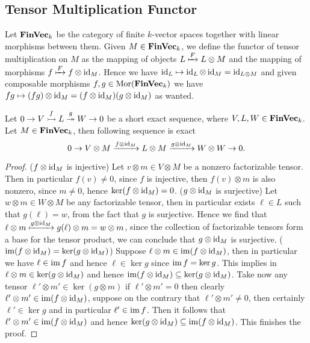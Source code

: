 \subsection{Tensor Multiplication Functor}

\begin{definition}
  Let \({\textbf{FinVec}}_k\) be the category of finite \(k\)-vector spaces together
  with linear morphisms between them. Given \(M \in {\textbf{FinVec}}_k\), we define
  the functor of tensor multiplication on \(M\) as the mapping of objects \(L
  \xmapsto F L \otimes M\) and the mapping of morphisms \(f \xmapsto F f \otimes
  \operatorname{id}_M\). Hence we have \(\operatorname{id}_L \mapsto \operatorname{id}_L \otimes \operatorname{id}_M = \operatorname{id}_{L \otimes
  M}\) and given composable morphisms \(f, g \in \operatorname{Mor}({\textbf{FinVec}}_k)\) we have
  \(f g \mapsto (f g) \otimes \operatorname{id}_M = (f \otimes \operatorname{id}_M) (g
  \otimes \operatorname{id}_M)\) as wanted.
\end{definition}

\begin{proposition}[Exactness]
  Let \(0 \to V \overset{f}{\rightarrowtail} L \overset{g}{\twoheadrightarrow} W \to
  0\) be a short exact sequence, where \(V, L, W \in {\textbf{FinVec}}_k\). Let \(M
  \in {\textbf{FinVec}}_k\), then following sequence is exact
  \[
    0 \to V \otimes M \xrightarrow{f \otimes \operatorname{id}_M}
    L \otimes M \xrightarrow{g \otimes \operatorname{id}_M} W \otimes W \to 0.
  \]
\end{proposition}

\begin{proof}
  (\(f \otimes \operatorname{id}_M\) is injective) Let \(v \otimes m \in V \otimes M\) be a
  nonzero factorizable tensor. Then in particular \(f(v) \neq 0\), since \(f\)
  is injective, then \(f(v) \otimes m\) is also nonzero, since \(m \neq 0\),
  hence \(\ker(f \otimes \operatorname{id}_M) = 0\). (\(g \otimes \operatorname{id}_M\) is surjective) Let
  \(w \otimes m \in W \otimes M\) be any factorizable tensor, then in particular
  exists \(\ell \in L\) such that \(g(\ell) = w\), from the fact that \(g\) is
  surjective. Hence we find that \(\ell \otimes m \xmapsto{g \otimes \operatorname{id}_M}
  g(\ell) \otimes m = w \otimes m\), since the collection of factorizable
  tensors form a base for the tensor product, we can conclude that \(g \otimes
  \operatorname{id}_M\) is surjective. (\(\operatorname{im}(f \otimes \operatorname{id}_M) = \ker(g \otimes \operatorname{id}_M)\))
  Suppose \(\ell \otimes m \in \operatorname{im}(f \otimes \operatorname{id}_M)\), then in particular we
  have \(\ell \in \operatorname{im} f\) and hence \(\ell \in \ker g\) since \(\operatorname{im} f = \ker
  g\). This implies in \(\ell \otimes m \in \ker(g \otimes \operatorname{id}_M)\) and hence
  \(\operatorname{im}(f \otimes \operatorname{id}_M) \subseteq \ker(g \otimes \operatorname{id}_M)\). Take now any tensor
  \(\ell' \otimes m' \in \ker(g \otimes m)\) if \(\ell' \otimes m' = 0\) then
  clearly  \(\ell' \otimes m' \in \operatorname{im}(f \otimes \operatorname{id}_M)\), suppose on the
  contrary that \(\ell' \otimes m' \neq 0\), then certainly \(\ell' \in \ker g\)
  and in particular \(\ell' \in \operatorname{im} f\). Then it follows that \(\ell' \otimes m'
  \in \operatorname{im}(f \otimes \operatorname{id}_M)\) and hence \(\ker(g \otimes \operatorname{id}_M) \subseteq \operatorname{im}(f
  \otimes \operatorname{id}_M)\). This finishes the proof.
\end{proof}

